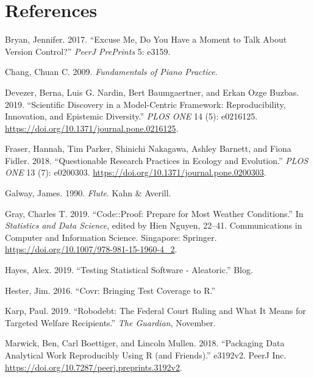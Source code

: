 \documentclass[
]{article}
\newlength{\cslhangindent}
\newenvironment{cslreferences}%
  {\setlength{\parindent}{0pt}%
  \everypar{\setlength{\hangindent}{\cslhangindent}}\ignorespaces}%
  {\par}
\begin{document}
\hypertarget{references}{%
\section*{References}\label{references}}

\hypertarget{refs}{}
\begin{cslreferences}
\leavevmode\hypertarget{ref-Bryan2017ExcuseMD}{}%
Bryan, Jennifer. 2017. ``Excuse Me, Do You Have a Moment to Talk About
Version Control?'' \emph{PeerJ PrePrints} 5: e3159.

\leavevmode\hypertarget{ref-chang_fundamentalspianopractice_2009a}{}%
Chang, Chuan C. 2009. \emph{Fundamentals of Piano Practice}.

\leavevmode\hypertarget{ref-devezerScientificDiscoveryModelcentric2019}{}%
Devezer, Berna, Luis G. Nardin, Bert Baumgaertner, and Erkan Ozge
Buzbas. 2019. ``Scientific Discovery in a Model-Centric Framework:
Reproducibility, Innovation, and Epistemic Diversity.'' \emph{PLOS ONE}
14 (5): e0216125. \url{https://doi.org/10.1371/journal.pone.0216125}.

\leavevmode\hypertarget{ref-fraser_questionable_2018}{}%
Fraser, Hannah, Tim Parker, Shinichi Nakagawa, Ashley Barnett, and Fiona
Fidler. 2018. ``Questionable Research Practices in Ecology and
Evolution.'' \emph{PLOS ONE} 13 (7): e0200303.
\url{https://doi.org/10.1371/journal.pone.0200303}.

\leavevmode\hypertarget{ref-galway_flute_1990}{}%
Galway, James. 1990. \emph{Flute}. Kahn \& Averill.

\leavevmode\hypertarget{ref-grayCodeProofPrepare2019}{}%
Gray, Charles T. 2019. ``Code::Proof: Prepare for Most Weather
Conditions.'' In \emph{Statistics and Data Science}, edited by Hien
Nguyen, 22--41. Communications in Computer and Information Science.
Singapore: Springer. \url{https://doi.org/10.1007/978-981-15-1960-4_2}.

\leavevmode\hypertarget{ref-hayes_testing_2019}{}%
Hayes, Alex. 2019. ``Testing Statistical Software - Aleatoric.'' Blog.

\leavevmode\hypertarget{ref-hester_covr_2016}{}%
Hester, Jim. 2016. ``Covr: Bringing Test Coverage to R.''

\leavevmode\hypertarget{ref-karp_robodebtfederalcourt_2019}{}%
Karp, Paul. 2019. ``Robodebt: The Federal Court Ruling and What It Means
for Targeted Welfare Recipients.'' \emph{The Guardian}, November.

\leavevmode\hypertarget{ref-marwick_packaging_2018}{}%
Marwick, Ben, Carl Boettiger, and Lincoln Mullen. 2018. ``Packaging Data
Analytical Work Reproducibly Using R (and Friends).'' e3192v2. PeerJ
Inc. \url{https://doi.org/10.7287/peerj.preprints.3192v2}.


\end{cslreferences}
\end{document}
